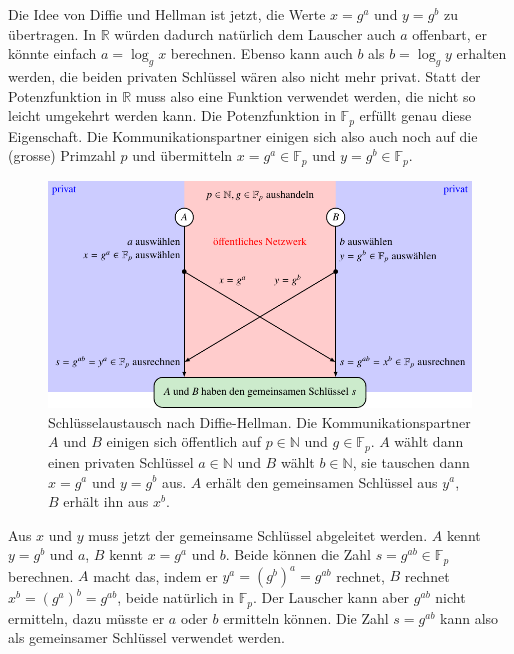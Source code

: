 Die Idee von Diffie und Hellman ist jetzt, die Werte $x=g^a$ und $y=g^b$
zu übertragen.
In $\mathbb{R}$ würden dadurch natürlich dem Lauscher auch $a$ offenbart,
er könnte einfach $a=\log_g x$ berechnen.
Ebenso kann auch $b$ als $b=\log_g y$ erhalten werden, die beiden
privaten Schlüssel wären also nicht mehr privat.
Statt der Potenzfunktion in $\mathbb{R}$ muss also eine Funktion
verwendet werden, die nicht so leicht umgekehrt werden kann.
Die Potenzfunktion in $\mathbb{F}_p$ erfüllt genau diese Eigenschaft.
Die Kommunikationspartner einigen sich also auch noch auf die (grosse)
Primzahl $p$ und übermitteln $x=g^a\in\mathbb{F}_p$ und
$y=g^b\in\mathbb{F}_p$.

\begin{figure}
\centering
\includegraphics{chapters/90-crypto/images/dh.pdf}
\caption{Schlüsselaustausch nach Diffie-Hellman.
%
%
Die Kommunikationspartner $A$ und $B$ einigen sich öffentlich auf
$p\in\mathbb{N}$ und $g\in\mathbb{F}_p$.
$A$ wählt dann einen privaten Schlüssel $a\in\mathbb{N}$ und
$B$ wählt $b\in\mathbb{N}$, sie tauschen dann $x=g^a$ und $y=g^b$
aus.
$A$ erhält den gemeinsamen Schlüssel aus $y^a$, $B$ erhält ihn
aus $x^b$.
\label{buch:crypto:fig:dh}}
\end{figure}

Aus $x$ und $y$ muss jetzt der gemeinsame Schlüssel abgeleitet werden.
$A$ kennt $y=g^b$ und $a$, $B$ kennt $x=g^a$ und $b$.
Beide können die Zahl $s=g^{ab}\in\mathbb{F}_p$ berechnen.
$A$ macht das, indem er $y^a=(g^b)^a = g^{ab}$ rechnet,
$B$ rechnet $x^b = (g^a)^b = g^{ab}$, beide natürlich in $\mathbb{F}_p$.
Der Lauscher kann aber $g^{ab}$ nicht ermitteln, dazu müsste er
$a$ oder $b$ ermitteln können.
Die Zahl $s=g^{ab}$ kann also als gemeinsamer Schlüssel verwendet
werden.

